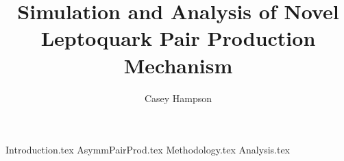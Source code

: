 \documentclass[titlepage]{article}
\title{Simulation and Analysis of Novel Leptoquark Pair Production Mechanism}
\author{Casey Hampson}
\begin{document}
    \maketitle
    \tableofcontents
    \pagebreak

    
    {Introduction.tex}
    {AsymmPairProd.tex}
    {Methodology.tex}
    {Analysis.tex}
            


    \pagebreak
    
    
    
\end{document}
